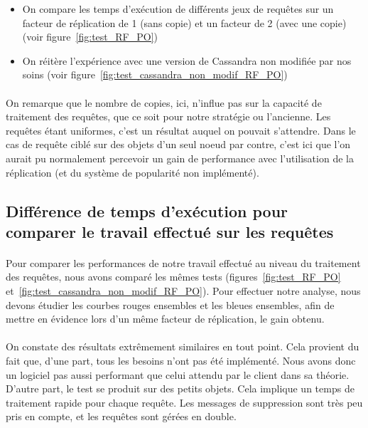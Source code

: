 \documentclass[12pt]{article}
\begin{document}
\begin{itemize}
    \item On compare les temps d'exécution de différents jeux de requêtes sur un facteur de réplication de 1 (sans copie) et un facteur de 2 (avec une copie) (voir figure~\ref{fig:test_RF_PO})
    \item On réitère l'expérience avec une version de Cassandra non modifiée par nos soins (voir figure~\ref{fig:test_cassandra_non_modif_RF_PO})
\end{itemize}

\paragraph{}On remarque que le nombre de copies, ici, n'influe pas sur la capacité de traitement des requêtes, que ce soit pour notre stratégie ou l'ancienne. Les requêtes étant uniformes, c'est un résultat auquel on pouvait s'attendre. Dans le cas de requête ciblé sur des objets d'un seul noeud par contre, c'est ici que l'on aurait pu normalement percevoir un gain de performance avec l'utilisation de la réplication (et du système de popularité non implémenté).

\subsection{Différence de temps d'exécution pour comparer le travail effectué sur les requêtes}

\paragraph{}Pour comparer les performances de notre travail effectué au niveau du traitement des requêtes, nous avons comparé les mêmes tests (figures~\ref{fig:test_RF_PO} et~\ref{fig:test_cassandra_non_modif_RF_PO}). Pour effectuer notre analyse, nous devons étudier les courbes rouges ensembles et les bleues ensembles, afin de mettre en évidence lors d'un même facteur de réplication, le gain obtenu.

\paragraph{}On constate des résultats extrêmement similaires en tout point. Cela provient du fait que, d'une part, tous les besoins n'ont pas été implémenté. Nous avons donc un logiciel pas aussi performant que celui attendu par le client dans sa théorie. D'autre part, le test se produit sur des petits objets. Cela implique un temps de traitement rapide pour chaque requête. Les messages de suppression sont très peu pris en compte, et les requêtes sont gérées en double.
\end{document}
